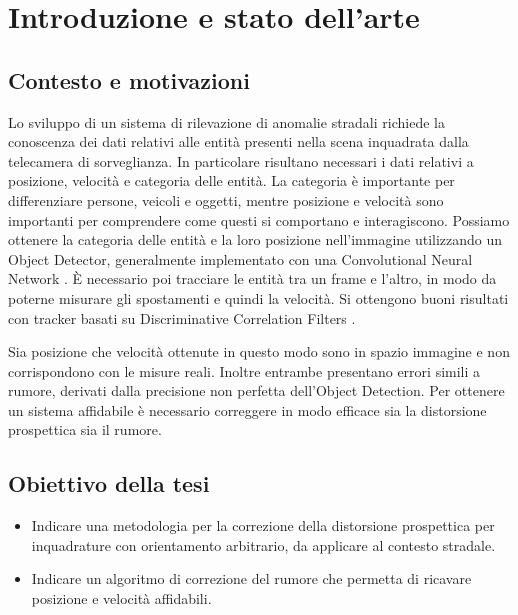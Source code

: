 \chapter{Introduzione e stato dell'arte}
\label{sec:introduzione}


\section{Contesto e motivazioni}

Lo sviluppo di un sistema di rilevazione di anomalie stradali richiede la conoscenza dei dati relativi alle entità presenti nella scena inquadrata dalla telecamera di sorveglianza.
In particolare risultano necessari i dati relativi a posizione, velocità e categoria delle entità.
La categoria è importante per differenziare persone, veicoli e oggetti, mentre posizione e velocità sono importanti per comprendere come questi si comportano e interagiscono.
Possiamo ottenere la categoria delle entità e la loro posizione nell'immagine utilizzando un Object Detector, generalmente implementato con una Convolutional Neural Network \cite{cnn}.
È necessario poi tracciare le entità tra un frame e l'altro, in modo da poterne misurare gli spostamenti e quindi la velocità.
Si ottengono buoni risultati con tracker basati su Discriminative Correlation Filters \cite{dcf}.

Sia posizione che velocità ottenute in questo modo sono in spazio immagine e non corrispondono con le misure reali.
Inoltre entrambe presentano errori simili a rumore, derivati dalla precisione non perfetta dell'Object Detection.
Per ottenere un sistema affidabile è necessario correggere in modo efficace sia la distorsione prospettica sia il rumore.

\section{Obiettivo della tesi}
\begin{itemize}
	\item Indicare una metodologia per la correzione della distorsione prospettica per inquadrature con orientamento arbitrario, da applicare al contesto stradale.
	\item Indicare un algoritmo di correzione del rumore che permetta di ricavare posizione e velocità affidabili.
\end{itemize}

